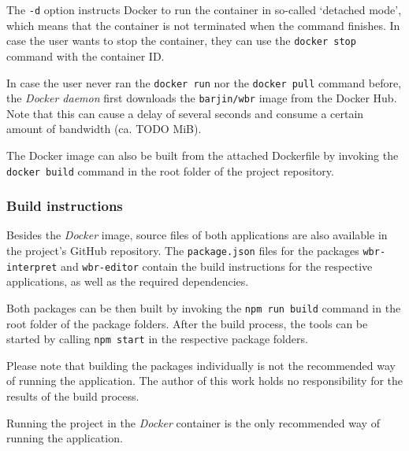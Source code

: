 The \texttt{-d} option instructs Docker to run the container in so-called `detached mode', which means that the container is not terminated when the command finishes. 
In case the user wants to stop the container, they can use the \texttt{docker stop} command with the container ID.

In case the user never ran the \texttt{docker run} nor the \texttt{docker pull} command before, the \textit{Docker daemon} first downloads the \texttt{barjin/wbr} image from the Docker Hub.
Note that this can cause a delay of several seconds and consume a certain amount of bandwidth (ca. TODO MiB).

The Docker image can also be built from the attached Dockerfile by invoking the \texttt{docker build} command in the root folder of the project repository.

\subsubsection{Build instructions}
Besides the \textit{Docker} image, source files of both applications are also available in the project's GitHub repository. 
The \texttt{package.json} files for the packages \texttt{wbr-interpret} and \texttt{wbr-editor} contain the build instructions for the respective applications,
as well as the required dependencies.


Both packages can be then built by invoking the \texttt{npm run build} command in the root folder of the package folders.
After the build process, the tools can be started by calling \texttt{npm start} in the respective package folders.

Please note that building the packages individually is not the recommended way of running the application.
The author of this work holds no responsibility for the results of the build process.

Running the project in the \textit{Docker} container is the only recommended way of running the application.